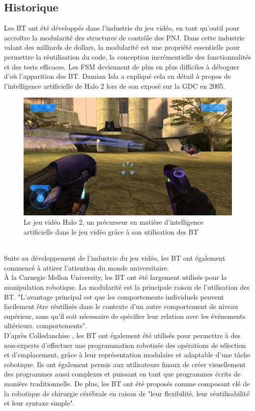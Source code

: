 \documentclass[titlepage]{article}
\begin{document}
		\subsection{Historique}
			Les BT ont été développés dans l’industrie du jeu vidéo, en tant qu’outil pour accroître la modularité des structures de contrôle des PNJ. Dans cette industrie valant des milliards de dollars, la modularité est une propriété essentielle pour permettre la réutilisation du code, la conception incrémentielle des fonctionnalités et des tests efficaces. Les FSM deviennent de plus en plus difficiles à déboguer d'où l'apparition des BT. Damian Isla a expliqué cela en détail à propos de l’intelligence artificielle de Halo 2 lors de son exposé sur la GDC en 2005. \cite{gdc_2005}
			\\
			\begin{figure}[h!]
				\includegraphics[width=\linewidth]{img/halo2.jpg}
				\caption{Le jeu vidéo Halo 2, un précurseur en matière d'intelligence artificielle dans le jeu vidéo grâce à son utilisation des BT \cite{wikipedia_halo}}
				\label{fig:BT1}
			\end{figure}
			\\
			Suite au développement de l'industrie du jeu vidéo, les BT ont également commencé à attirer l'attention du monde universitaire.
			\\
			À la Carnegie Mellon University, les BT ont été largement utilisés pour la manipulation robotique. La modularité est la principale raison de l'utilisation des BT. "L'avantage principal est que les comportements individuels peuvent facilement être réutilisés dans le contexte d'un autre comportement de niveau supérieur, sans qu'il soit nécessaire de spécifier leur relation avec les événements ultérieurs. comportements".\cite{Bagnell_2012_7606}
			\\
			D'après Colledanchise \cite{colledanchise_2017}, les BT ont également été utilisés pour permettre à des non-experts d’effectuer une programmation robotisée des opérations de sélection et d’emplacement, grâce à leur représentation modulaire et adaptable d’une tâche robotique. Ils ont également permis aux utilisateurs finaux de créer visuellement des programmes aussi complexes et puissant en tant que programmes écrits de manière traditionnelle. De plus, les BT ont été proposés comme composant clé de la robotique de chirurgie cérébrale en raison de "leur flexibilité, leur réutilisabilité et leur syntaxe simple".\cite{hu_gong_hannaford_seibel_2015}
	\clearpage
\end{document}
